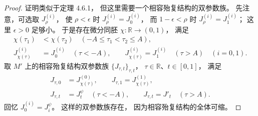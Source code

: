 \begin{proof}
证明类似于定理 4.6.1，
但这里需要一个相容殆复结构的双参数族。
先注意，可选取 $J^{(i)}_\rho$，
使 $\rho<\epsilon$ 时
$J^{(i)}_\rho=J^{(i)}_0$，
而 $1-\epsilon<\rho$ 时
$J^{(i)}_\rho=J^{(i)}_1$；
这里 $\epsilon>0$ 足够小。
于是存在微分同胚
$\chi\colon\mathbb R\to(0,1)$，
满足
\begin{align}
\chi(\tau_1)&<\chi(\tau_2)
\quad(-A\le\tau_1<\tau_2\le A),
\tag{5.3.2.1}\label{eq:5-3-2-1}\\
J^{(i)}_{\chi(\tau)}
&=J^{(i)}_0\quad(\tau<-A),
\qquad
J^{(i)}_{\chi(\tau)}
=J^{(i)}_1\quad(\tau>A)
\quad(i=0,1).
\tag{5.3.2.2}\label{eq:5-3-2-2}
\end{align}
取 $M'$ 上的相容殆复结构双参数族
$\{J_{\tau,t}\}_{\tau,t}$，
$\tau\in\mathbb R$、$t\in[0,1]$，
满足
\begin{align}
J_{\tau,0}&=J^{(0)}_{\chi(\tau)},
\qquad
J_{\tau,1}=J^{(1)}_{\chi(\tau)},
\tag{5.3.3.1}\label{eq:5-3-3-1}\\
J_{\tau,t}
&=J^\psi_t\quad(\tau<-A),
\qquad
J_{\tau,t}=J'_t\quad(\tau>A).
\tag{5.3.3.2}\label{eq:5-3-3-2}
\end{align}
回忆 $J^{(i)}_0=J_i^\psi$。
这样的双参数族存在，
因为相容殆复结构的全体可缩。


\end{proof}
